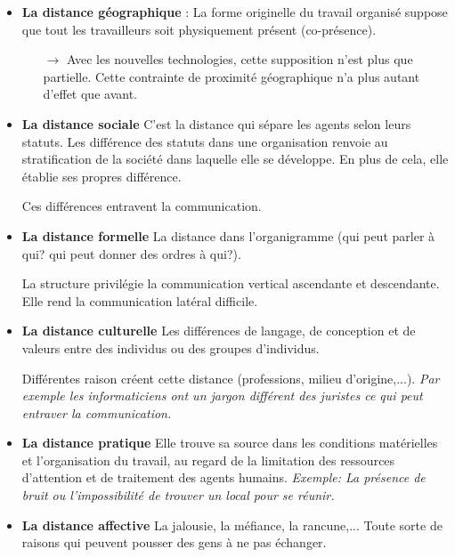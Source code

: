 \documentclass[11pt]{article} %
\begin{document}
\begin{itemize}


 \item \textbf{La distance géographique} : La forme originelle du
travail organisé suppose que tout les travailleurs soit physiquement
présent (co-présence). 
    \begin{itemize}
        \item[$\to$] Avec les nouvelles technologies, cette
    supposition n'est plus que partielle. Cette contrainte de proximité
    géographique n'a plus autant d'effet que avant.
    \end{itemize}

 \item \textbf{La distance sociale} C'est la distance qui sépare
les agents selon leurs statuts. Les différence des statuts dans
une organisation renvoie au stratification de la société dans
laquelle elle se développe. 
En plus de cela, elle établie ses propres différence.

Ces différences entravent la communication.

 \item \textbf{La distance formelle} La distance dans l'organigramme
(qui peut parler à qui? qui peut donner des ordres à qui?). 

La structure privilégie la communication vertical ascendante et
descendante. Elle rend la communication latéral difficile.

 \item \textbf{La distance culturelle} Les différences de langage, de
conception et de valeurs entre des individus ou des groupes d'individus.

Différentes raison créent cette distance (professions, milieu
d'origine,...). \textit{Par exemple les informaticiens ont un jargon
différent des juristes ce qui peut entraver la communication.}

 \item \textbf{La distance pratique} Elle trouve sa source dans les
conditions matérielles et l'organisation du travail, au regard de
la limitation des ressources d'attention et de traitement des agents
humains. \textit{Exemple: La présence de bruit ou l'impossibilité de
trouver un local pour se réunir.}

\item \textbf{La distance affective} La jalousie, la méfiance, la
rancune,... Toute sorte de raisons qui peuvent pousser des gens à
ne pas échanger.

\end{itemize}
\end{document}
